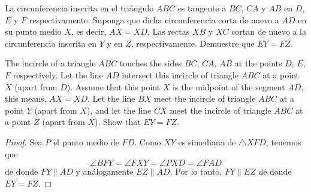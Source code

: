 \begin{probMG}[IberoAmerican 1995/5]
  La circunferencia inscrita en el triángulo $ABC$ es tangente a $BC$, $CA$ y
  $AB$ en $D$, $E$ y $F$ respectivamente. Suponga que dicha circunferencia corta
  de nuevo a $AD$ en su punto medio $X$, es decir, $AX=XD$. Las rectas $XB$ y
  $XC$ cortan de nuevo a la circunferencia inscrita en $Y$ y en $Z$,
  respectivamente. Demuestre que $EY=FZ$.
  \begin{hint}
    The incircle of a triangle $ABC$ touches the sides $BC$, $CA$, $AB$ at the
    points $D$, $E$, $F$ respectively. Let the line $AD$ intersect this incircle
    of triangle $ABC$ at a point $X$ (apart from $D$). Assume that this point
    $X$ is the midpoint of the segment $AD$, this means, $AX=XD$. Let the line
    $BX$ meet the incircle of triangle $ABC$ at a point $Y$ (apart from $X$),
    and let the line $CX$ meet the incircle of triangle $ABC$ at a point $Z$
    (apart from $X$). Show that $EY=FZ$.
  \end{hint}
\end{probMG}

\begin{proof}
  Sea $P$ el punto medio de $FD$. Como $XY$ es simediana de $\triangle XFD$,
  tenemos que
  \[\angle BFY=\angle FXY=\angle PXD=\angle FAD\]
  de donde $FY\parallel AD$ y análogamente $EZ\parallel AD$. Por lo tanto,
  $FY\parallel EZ$ de donde $EY=FZ$.
\end{proof}

